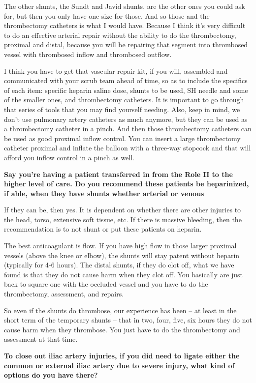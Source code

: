 \documentclass[
]{book}
\begin{document}
The other shunts, the Sundt and Javid shunts, are the other ones you
could ask for, but then you only have one size for those. And so those
and the thrombectomy catheters is what I would have. Because I think
it's very difficult to do an effective arterial repair without the
ability to do the thrombectomy, proximal and distal, because you will be
repairing that segment into thrombosed vessel with thrombosed inflow and
thrombosed outflow.

I think you have to get that vascular repair kit, if you will, assembled
and communicated with your scrub team ahead of time, so as to include
the specifics of each item: specific heparin saline dose, shunts to be
used, SH needle and some of the smaller ones, and thrombectomy
catheters. It is important to go through that series of tools that you
may find yourself needing. Also, keep in mind, we don't use pulmonary
artery catheters as much anymore, but they can be used as a thrombectomy
catheter in a pinch. And then those thrombectomy catheters can be used
as good proximal inflow control. You can insert a large thrombectomy
catheter proximal and inflate the balloon with a three-way stopcock and
that will afford you inflow control in a pinch as well.

\textbf{Say you're having a patient transferred in from the Role II to the
higher level of care. Do you recommend these patients be heparinized, if
able, when they have shunts whether arterial or venous}

If they can be, then yes. It is dependent on whether there are other injuries to the head, torso, extensive soft tissue, etc. If there is massive bleeding, then the recommendation is to not shunt or put these patients on heparin.

The best anticoagulant is flow. If you have high flow in those larger proximal vessels (above the knee or elbow), the shunts will stay patent without heparin (typically for 4-6 hours). The distal shunts, if they do clot off, what we have found is that they do not cause harm when they clot off. You
basically are just back to square one with the occluded vessel and you
have to do the thrombectomy, assessment, and repairs.

So even if the shunts do thrombose, our experience has been -- at least
in the short term of the temporary shunts -- that in two, four, five,
six hours they do not cause harm when they thrombose. You just have to
do the thrombectomy and assessment at that time.

\textbf{To close out iliac artery injuries, if you did need to ligate either
the common or external iliac artery due to severe injury, what kind of
options do you have there?}
\end{document}

